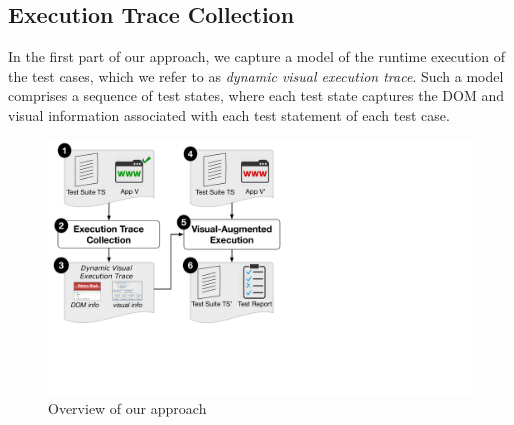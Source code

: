\subsection{Execution Trace Collection}
%
In the first part of our approach, we capture a model of the runtime execution of the test cases, which we refer to as \textit{dynamic visual execution trace}.
Such a model comprises a sequence of test states, where each test state captures the DOM and visual information associated with each test statement of each test case. 

\begin{figure}[t]
\centering
\includegraphics[trim={0.2cm 6.5cm 17cm 0.2cm},clip,scale=0.28]{images/approach-bigger}
\caption{Overview of our approach}
\label{approach}
\end{figure}




